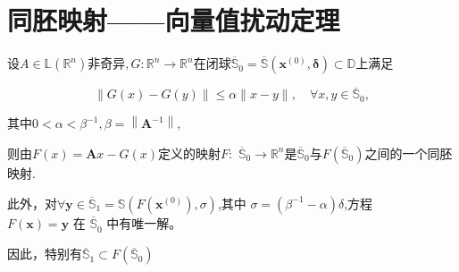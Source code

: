 \documentclass{lzureport}
\begin{document}
\section{同胚映射——向量值扰动定理}
设$A\in\mathbb{L}\left(\mathbb{R}^n\right)$非奇异$,G:\mathbb{R}^n\to\mathbb{R}^n$在闭球$\overline{\mathbb{S}}_0=\overline{\mathbb{S}}\left(\boldsymbol{x}^{(0)},\boldsymbol{\delta}\right)\subset \mathbb{D}$上满足

$$\|G(x)-G(y)\|\leqslant\alpha\|x-y\|,\quad\forall x,y\in\overline{\mathbb{S}}_0,$$

其中$0<\alpha<\beta^{-1},\beta=\left\|\boldsymbol{A}^{-1}\right\|$,

则由$F(x)=\boldsymbol{A}x-G(x)$定义的映射$F:$ $\overline{\mathbb{S}}_0\to\mathbb{R}^n$是$\overline{\mathbb{S}}_0$与$F\left(\overline{\mathbb{S}}_0\right)$之间的一个\textcolor{YBXPurple}{同胚映射}.

此外，对$\forall\boldsymbol{y}\in\overline{\mathbb{S}}_1=\mathbb{S}\left(F\left(\boldsymbol{x}^{(0)}\right),\sigma\right)$,其中 $\sigma=\left(\beta^{-1}-\alpha\right)\delta$,方程 $F(\boldsymbol{x})=\boldsymbol{y\text{ 在 }\overline{\mathbb{S}}}_0$ 中有唯一解。

因此，特别有$\overline{\mathbb{S}}_1\subset F\left(\overline{\mathbb{S}}_0\right)$
\end{document}
